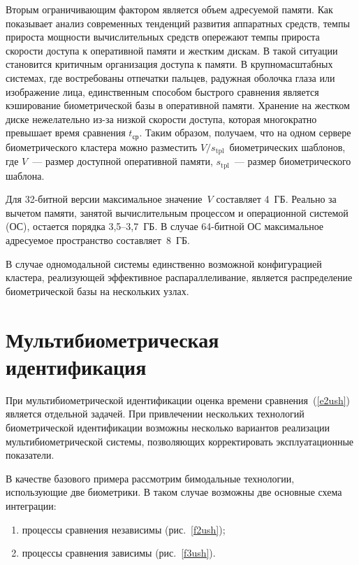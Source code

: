 \begin{multicols}{2}
     Вторым ограничивающим фактором является объем адресуемой памяти. Как 
показывает анализ современных тенденций развития аппаратных средств, темпы 
прироста мощности вычислительных средств опережают темпы прироста скорости 
доступа к оперативной памяти и жестким дискам. В такой ситуации становится 
критичным ор\-га\-ни\-за\-ция доступа к памяти. В крупномасштабных %
систе\-мах, где 
востребованы отпечатки пальцев, радужная оболочка глаза или изображение лица, 
единст\-вен\-ным способом быстрого сравнения является кэширование биометрической 
базы в оперативной памяти. Хранение на жестком диске %
 нежелательно из-за низкой 
скорости доступа, которая многократно превышает время сравнения 
$t_{\mathrm{ср}}$. Таким образом, получаем, что на одном сервере биометрического 
кластера можно разместить $V/s_{\mathrm{tpl}}$~биометрических шаблонов, где $V$~--- размер 
доступной оперативной памяти, $s_{\mathrm{tpl}}$~--- размер биометрического шаблона. 
      
      Для 32-битной версии максимальное значение~$V$ составляет 4~ГБ. Реально за 
вычетом памяти, занятой вычислительным процессом и операционной сис\-те\-мой (ОС), остается порядка 
      3,5--3,7~ГБ. В случае 64-бит\-ной ОС максимальное адресуемое пространство 
составляет~8~ГБ.
   

     В случае одномодальной системы единственно возможной конфигурацией 
кластера, реализующей эффективное распараллеливание, является распределение 
биометрической базы на нескольких %
\mbox{узлах}. 
{

}
     
     \section{Мультибиометрическая идентификация}
     
     При мультибиометрической идентификации оценка времени 
сравнения~(\ref{e2ush}) является отдельной задачей. При привлечении нескольких 
техно\-ло\-гий биометрической идентификации возможны несколь\-ко вариантов 
реализации муль\-ти\-био\-мет\-ри\-че\-ской сис\-те\-мы, позволяющих корректировать 
эксплуатационные показатели. 
     
     В качестве базового примера рассмотрим бимодальные технологии, 
использующие две биометрики. В таком случае возможны две основные схема 
интеграции: 
     \begin{enumerate}[(1)]
\item процессы сравнения независимы (рис.~\ref{f2ush}); 
\item процессы сравнения зависимы (рис.~\ref{f3ush}).
\end{enumerate}


\end{multicols}
